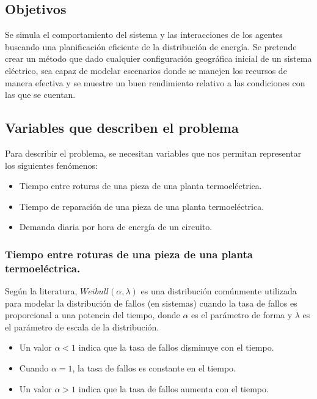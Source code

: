\documentclass[twocolumn, fontsize=10pt]{article}
\begin{document}
\subsection{Objetivos}
Se simula el comportamiento del sistema y las interacciones de los agentes buscando una planificación eficiente de la distribución de energía.
Se pretende crear un método que dado cualquier configuración geográfica inicial de un sistema eléctrico, sea capaz de modelar
escenarios donde se manejen los recursos de manera efectiva y se muestre un buen rendimiento relativo a las condiciones con las que se cuentan.  

\subsection{Variables que describen el problema}

Para describir el problema, se necesitan variables que nos permitan representar los siguientes fenómenos:
\begin{itemize}

    \item Tiempo entre roturas de una pieza de una planta termoeléctrica.
    \item Tiempo de reparación de una pieza de una planta termoeléctrica.
    \item Demanda diaria por hora de energía de un circuito.
\end{itemize}
\subsubsection{Tiempo entre roturas de una pieza de una planta termoeléctrica.}
    
Según la literatura, \( Weibull(\alpha, \lambda) \) es una distribución comúnmente utilizada para modelar la distribución de fallos (en sistemas) cuando la tasa de fallos es proporcional a una potencia del tiempo, donde \( \alpha \) es el parámetro de forma y \( \lambda \) es el parámetro de escala de la distribución.
\begin{itemize}
    \item Un valor \( \alpha < 1 \) indica que la tasa de fallos disminuye con el tiempo.
    \item Cuando \( \alpha = 1 \), la tasa de fallos es constante en el tiempo.
    \item Un valor \( \alpha > 1 \) indica que la tasa de fallos aumenta con el tiempo.
\end{itemize}
\end{document}
